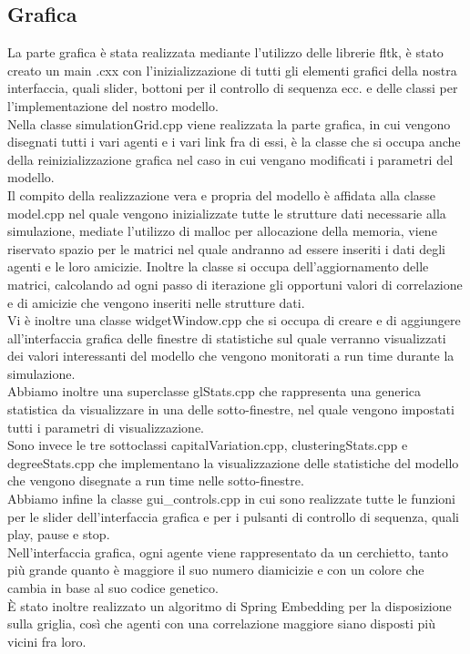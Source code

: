\documentclass[a4paper,10pt]{article}
\begin{document}
\subsection{Grafica}
La parte grafica \`e stata realizzata mediante l'utilizzo delle librerie fltk, \`e stato creato un main .cxx con l'inizializzazione di tutti 
gli elementi grafici della nostra interfaccia, quali slider, bottoni per il controllo di sequenza ecc. e delle classi per l'implementazione
del  nostro modello.\\
Nella classe simulationGrid.cpp viene realizzata la parte grafica, in cui vengono disegnati tutti i vari agenti e i vari link fra di essi, \`e 
la classe che si occupa anche della reinizializzazione grafica nel caso in cui vengano modificati i parametri del modello.\\
Il compito della realizzazione vera e propria del modello \`e affidata alla classe model.cpp nel quale vengono inizializzate tutte le strutture 
dati necessarie alla simulazione, mediate l'utilizzo di malloc per allocazione della memoria, viene riservato spazio per le matrici nel quale 
andranno ad essere inseriti i dati degli agenti e le loro amicizie. Inoltre la classe si occupa dell'aggiornamento delle matrici, calcolando ad 
ogni passo di iterazione gli opportuni valori di correlazione e di amicizie che vengono inseriti nelle strutture dati.\\
Vi \`e inoltre una classe widgetWindow.cpp che si occupa di creare e di aggiungere all'interfaccia grafica delle  finestre di statistiche sul
quale verranno visualizzati dei valori interessanti del modello che vengono monitorati a run time durante la simulazione.\\
Abbiamo inoltre una superclasse glStats.cpp che rappresenta una generica statistica da visualizzare in una delle sotto-finestre, nel quale 
vengono impostati tutti i parametri di visualizzazione.\\
Sono invece le tre sottoclassi capitalVariation.cpp, clusteringStats.cpp e degreeStats.cpp che implementano la visualizzazione delle statistiche del
modello che vengono disegnate a run time nelle sotto-finestre.\\
Abbiamo infine la classe gui\_controls.cpp in cui sono realizzate tutte le funzioni per le slider dell'interfaccia grafica e per i pulsanti di 
controllo  di sequenza, quali play, pause e stop.\\
Nell'interfaccia grafica, ogni agente viene rappresentato da un cerchietto, tanto pi\`u grande quanto \`e maggiore il suo numero diamicizie
e con un colore che cambia in base al suo codice genetico.\\
\`E stato inoltre realizzato un algoritmo di Spring Embedding per la disposizione sulla griglia, cos\`i che agenti con una correlazione
maggiore siano disposti pi\`u vicini fra loro.
\end{document}

